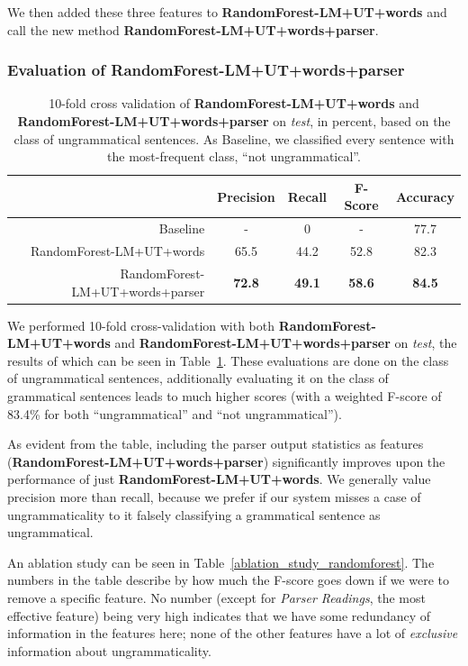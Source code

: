 \documentclass[a4paper,10pt]{scrartcl}
\theoremstyle{style}
\begin{document}
We then added these three features to \textbf{RandomForest-LM+UT+words} and call the new method \textbf{RandomForest-LM+UT+words+parser}.

\subsubsection{Evaluation of RandomForest-LM+UT+words+parser}

\begin{table}
\begin{center}
\begin{tabular}{|r|c|c|c|c|}
  \hline
  & \textbf{Precision} & \textbf{Recall} & \textbf{F-Score} & \textbf{Accuracy}\\
  \hline
  Baseline & - & 0 & - & 77.7\\
  \hline
  RandomForest-LM+UT+words & 65.5 & 44.2 & 52.8 & 82.3\\
  \hline
  RandomForest-LM+UT+words+parser & \textbf{72.8} & \textbf{49.1} & \textbf{58.6} & \textbf{84.5}\\
  \hline
  \end{tabular}
\end{center}
\caption{10-fold cross validation of \textbf{RandomForest-LM+UT+words} and \textbf{RandomForest-LM+UT+words+parser} on \textit{test}, in percent, based on the class of ungrammatical sentences. As Baseline, we classified every sentence with the most-frequent class, ``not ungrammatical''.}
\label{eval_randomforest}
\end{table}


We performed 10-fold cross-validation with both \textbf{RandomForest-LM+UT+words} and \textbf{RandomForest-LM+UT+words+parser} on \textit{test}, the results of which can be seen in Table~\ref{eval_randomforest}. These evaluations are done on the class of ungrammatical sentences, additionally evaluating it on the class of grammatical sentences leads to much higher scores (with a weighted F-score of 83.4\% for both ``ungrammatical'' and ``not ungrammatical'').

As evident from the table, including the parser output statistics as features (\textbf{RandomForest-LM+UT+words+parser}) significantly improves upon the performance of just \textbf{RandomForest-LM+UT+words}. We generally value precision more than recall, because we prefer if our system misses a case of ungrammaticality to it falsely classifying a grammatical sentence as ungrammatical.

An ablation study can be seen in Table~\ref{ablation_study_randomforest}.
The numbers in the table describe by how much the F-score goes down if we were to remove a specific feature.
No number (except for \textit{Parser Readings}, the most effective feature) being very high indicates that we have some redundancy of information in the features here; none of the other features have a lot of \textit{exclusive} information about ungrammaticality.
\end{document}
